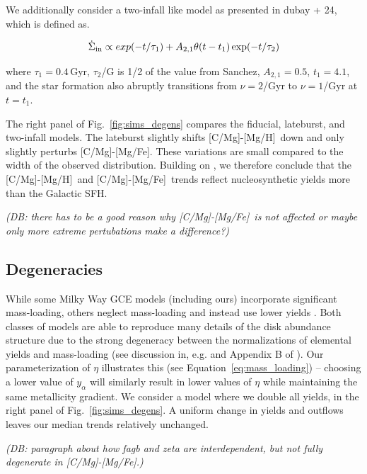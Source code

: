 \documentclass[fleqn,
usenatbib]{mnras}
\newcommand{\gce}{GCE}
\newcommand{\caah}{[C/Mg]-[Mg/H]}
\newcommand{\caafe}{[C/Mg]-[Mg/Fe]}
\newcommand{\dbadd}[1]{{\color{Thistle} #1}}
\newcommand{\dbnote}[1]{ {\color{Thistle} \textit{\small (DB: #1)}} }
\begin{document}
We additionally consider a two-infall like model as presented in \dbadd{dubay + 24}, which is defined as.

\begin{equation}\label{twoinfall}
\dot{\Sigma}_{\rm in} \propto exp(-t/\tau_1) + A_{2,1} \theta(t - t_{1}) \exp(-t/\tau_2)
\end{equation}

where $\tau_1=0.4\,$Gyr, $\tau_2$/G is 1/2 of the value from Sanchez, $A_{2,1}=0.5$, $t_1=4.1$, and the star formation also abruptly transitions from $\nu=2$/Gyr to $\nu=1$/Gyr at $t=t_1$.

The right panel of Fig.~\ref{fig:sims_degens} compares the fiducial, lateburst, and two-infall models. The lateburst slightly shifts \caah\ down and only slightly perturbs \caafe. These variations are small compared to the width of the observed distribution. 
Building on \citet{james+23}, we therefore conclude that the \caah\ and \caafe\ trends reflect nucleosynthetic yields more than the Galactic SFH. 

\dbnote{there has to be a good reason why \caafe\ is not affected or maybe only more extreme pertubations make a difference?}



\subsection{Degeneracies} \label{sec:outflows}

While some Milky Way \gce{} models (including ours) incorporate significant mass-loading, others
neglect mass-loading and instead use lower yields \citep[e.g.][]{MCM13, MCM14, spitoni19, spitoni20, spitoni21}.
Both classes of models are able to reproduce many details of the disk abundance structure due to the strong degeneracy between the normalizations of elemental yields and mass-loading (see discussion in, e.g. \citealt{sandford+24} and Appendix B of \citealt{james+23}). 
Our parameterization of $\eta$ illustrates this (see Equation~\ref{eq:mass_loading}) -- choosing a lower value of $y_{\alpha}$ will similarly result in lower values of $\eta$ while maintaining the same metallicity gradient. 
We consider a model where we double all yields, in the right panel of Fig.~\ref{fig:sims_degens}. A uniform change in yields and outflows leaves our median trends relatively unchanged. 

\dbnote{paragraph about how fagb and zeta are interdependent, but not fully degenerate in \caafe.}
\end{document}
